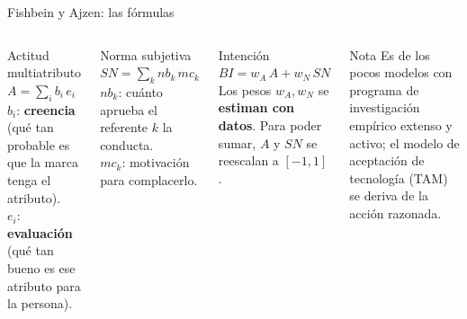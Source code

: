 \documentclass[aspectratio=169,xcolor=dvipsnames]{beamer}
\begin{document}
\begin{frame}{Fishbein y Ajzen: las fórmulas}
\begin{columns}[T]
  \begin{block}{Actitud multiatributo}
    \small $A=\sum_i b_i\,e_i$\\[2pt]
    $b_i$: \textbf{creencia} (qué tan probable es que la marca tenga el atributo).\\
    $e_i$: \textbf{evaluación} (qué tan bueno es ese atributo para la persona).
  \end{block}
  \begin{block}{Norma subjetiva}
    \small $SN=\sum_k nb_k\,mc_k$\\[2pt]
    $nb_k$: cuánto aprueba el referente $k$ la conducta.\\
    $mc_k$: motivación para complacerlo.
  \end{block}
  \begin{exampleblock}{Intención}
    \small $BI=w_A\,A+w_N\,SN$\\[2pt]
    Los pesos $w_A, w_N$ se \textbf{estiman con datos}. Para poder sumar, $A$ y $SN$ se reescalan a $[-1,1]$.
  \end{exampleblock}
  \begin{alertblock}{Nota}
    \footnotesize Es de los pocos modelos con programa de investigación empírico extenso y activo; el modelo de aceptación de tecnología (TAM) se deriva de la acción razonada.
  \end{alertblock}
\end{columns}
\end{frame}
\end{document}
